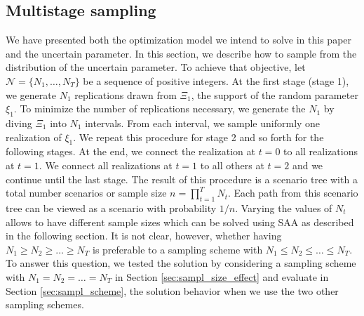\documentclass[forests,article,submit,moreauthors,pdftex]{Definitions/mdpi}
\begin{document}
\begin{table}[!htb]
\caption{Forest growth change (\%) due to climate change}
\label{tb:climate_data}
\centering
{}
\end{table}

\subsection{Multistage sampling} \label{sec:sampling}

We have presented both the optimization model  we intend to solve in this paper and the uncertain parameter. In this section, we describe how to sample from the distribution of the uncertain parameter. To achieve that objective,  let $\mathcal{N} = \{N_1, \dots, N_{T} \}$ be a sequence of positive integers. At the first stage (stage 1), we generate $N_1$ replications drawn from $\Xi_1$, the support of the random parameter $\xi_1$. To minimize the number of replications necessary, we generate the $N_1$ by diving  $\Xi_1$ into $N_1$ intervals. From each interval, we sample uniformly one realization of $\xi_1$. We repeat this procedure for stage 2 and so forth for the following stages. At the end, we connect the realization at $t=0$ to all realizations at $t=1$. We connect all realizations at $t=1$ to all others at $t=2$ and we continue until the last stage. The result of this procedure is a scenario tree with a total number scenarios or sample size  $n = \prod_{t=1}^{T}N_t$. Each path from this scenario tree can be viewed as a scenario with probability $1 / n$. Varying the values of $N_t$ allows to have different sample sizes which can be solved using SAA as described in the following section. It is not clear, however, whether having $N_1 \ge N_2 \ge \dots \ge N_T$ is preferable to a sampling scheme with $N_1 \le N_2 \le \dots \le N_T$. To answer  this question, we tested the solution by considering a sampling scheme with  $N_1 = N_2 =\dots = N_T$ in Section \ref{sec:sampl_size_effect} and evaluate in Section \ref{sec:sampl_scheme}, the solution behavior when we use the two other sampling schemes.
\end{document}
